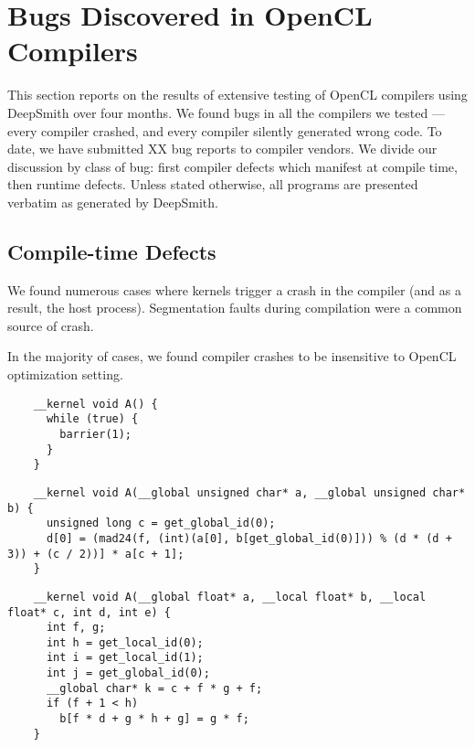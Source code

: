 \section{Bugs Discovered in OpenCL Compilers}

This section reports on the results of extensive testing of OpenCL compilers using DeepSmith over four months. We found bugs in all the compilers we tested --- every compiler crashed, and every compiler silently generated wrong code. To date, we have submitted XX bug reports to compiler vendors. We divide our discussion by class of bug: first compiler defects which manifest at compile time, then runtime defects. Unless stated otherwise, all programs are presented verbatim as generated by DeepSmith.


\subsection{Compile-time Defects}

We found numerous cases where kernels trigger a crash in the compiler (and as a result, the host process). Segmentation faults during compilation were a common source of crash.

In the majority of cases, we found compiler crashes to be insensitive to OpenCL optimization setting.

\newsavebox{\IntelVectorizerSegfault}
\begin{lrbox}{\IntelVectorizerSegfault}
  \hspace{1.5em}
  \begin{lstlisting}
    __kernel void A() {
      while (true) {
        barrier(1);
      }
    }
  \end{lstlisting}
\end{lrbox}

\newsavebox{\OclgrindSemaAssertion}
\begin{lrbox}{\OclgrindSemaAssertion}
  \hspace{1.5em}
  \begin{lstlisting}
    __kernel void A(__global unsigned char* a, __global unsigned char* b) {
      unsigned long c = get_global_id(0);
      d[0] = (mad24(f, (int)(a[0], b[get_global_id(0)])) % (d * (d + 3)) + (c / 2))] * a[c + 1];
    }
  \end{lstlisting}
\end{lrbox}

\newsavebox{\NvidiaCompileSegfault}
\begin{lrbox}{\NvidiaCompileSegfault}
  \hspace{1.5em}
  \begin{lstlisting}
    __kernel void A(__global float* a, __local float* b, __local float* c, int d, int e) {
      int f, g;
      int h = get_local_id(0);
      int i = get_local_id(1);
      int j = get_global_id(0);
      __global char* k = c + f * g + f;
      if (f + 1 < h)
        b[f * d + g * h + g] = g * f;
    }
  \end{lstlisting}
\end{lrbox}

